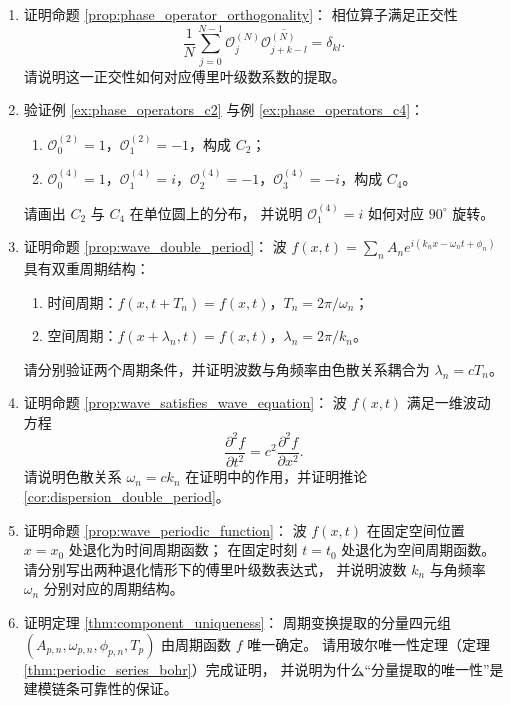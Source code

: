 \begin{enumerate}[leftmargin=3em, label=\textbf{题 \arabic*}]
    \item 证明命题 \ref{prop:phase_operator_orthogonality}：
    相位算子满足正交性
    \[
    \frac{1}{N}\sum_{j=0}^{N-1}\mathcal{O}_j^{(N)}\overline{\mathcal{O}_{j+k-l}^{(N)}}=\delta_{kl}.
    \]
    请说明这一正交性如何对应傅里叶级数系数的提取。

    \item 验证例 \ref{ex:phase_operators_c2} 与例 \ref{ex:phase_operators_c4}：
    \begin{enumerate}[label=(\roman*)]
        \item $\mathcal{O}_0^{(2)}=1$，$\mathcal{O}_1^{(2)}=-1$，构成 $C_2$；
        \item $\mathcal{O}_0^{(4)}=1$，$\mathcal{O}_1^{(4)}=i$，$\mathcal{O}_2^{(4)}=-1$，$\mathcal{O}_3^{(4)}=-i$，构成 $C_4$。
    \end{enumerate}
    请画出 $C_2$ 与 $C_4$ 在单位圆上的分布，
    并说明 $\mathcal{O}_1^{(4)}=i$ 如何对应 $90^\circ$ 旋转。

    \item 证明命题 \ref{prop:wave_double_period}：
    波 $f(x,t)=\sum_nA_ne^{i(k_nx-\omega_nt+\phi_n)}$ 具有双重周期结构：
    \begin{enumerate}[label=(\roman*)]
        \item 时间周期：$f(x,t+T_n)=f(x,t)$，$T_n=2\pi/\omega_n$；
        \item 空间周期：$f(x+\lambda_n,t)=f(x,t)$，$\lambda_n=2\pi/k_n$。
    \end{enumerate}
    请分别验证两个周期条件，并证明波数与角频率由色散关系耦合为 $\lambda_n=cT_n$。

    \item 证明命题 \ref{prop:wave_satisfies_wave_equation}：
    波 $f(x,t)$ 满足一维波动方程
    \[
    \frac{\partial^2 f}{\partial t^2}=c^2\frac{\partial^2 f}{\partial x^2}.
    \]
    请说明色散关系 $\omega_n=ck_n$ 在证明中的作用，并证明推论 \ref{cor:dispersion_double_period}。

    \item 证明命题 \ref{prop:wave_periodic_function}：
    波 $f(x,t)$ 在固定空间位置 $x=x_0$ 处退化为时间周期函数；
    在固定时刻 $t=t_0$ 处退化为空间周期函数。
    请分别写出两种退化情形下的傅里叶级数表达式，
    并说明波数 $k_n$ 与角频率 $\omega_n$ 分别对应的周期结构。

    \item 证明定理 \ref{thm:component_uniqueness}：
    周期变换提取的分量四元组 $(A_{p,n},\omega_{p,n},\phi_{p,n},T_p)$
    由周期函数 $f$ 唯一确定。
    请用玻尔唯一性定理（定理 \ref{thm:periodic_series_bohr}）完成证明，
    并说明为什么“分量提取的唯一性”是建模链条可靠性的保证。


\end{enumerate}
